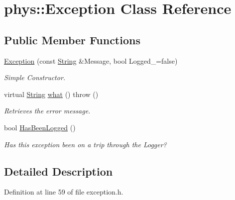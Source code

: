 \hypertarget{classphys_1_1Exception}{
\section{phys::Exception Class Reference}
\label{dc/d47/classphys_1_1Exception}
}
\subsection*{Public Member Functions}
\begin{DoxyCompactItemize}
\item 
\hyperlink{classphys_1_1Exception_a73fd1d2603e30f5663fef2d64df5179f}{Exception} (const \hyperlink{namespacephys_aa03900411993de7fbfec4789bc1d392e}{String} \&Message, bool Logged\_\-=false)
\begin{DoxyCompactList}\small\item\em Simple Constructor. \item\end{DoxyCompactList}\item 
virtual \hyperlink{namespacephys_aa03900411993de7fbfec4789bc1d392e}{String} \hyperlink{classphys_1_1Exception_ac929f9b3929526eec6e6b581c9a9dd73}{what} ()  throw ()
\begin{DoxyCompactList}\small\item\em Retrieves the error message. \item\end{DoxyCompactList}\item 
bool \hyperlink{classphys_1_1Exception_ab1399e25435c390db551855fda338951}{HasBeenLogged} ()
\begin{DoxyCompactList}\small\item\em Has this exception been on a trip through the Logger? \item\end{DoxyCompactList}\end{DoxyCompactItemize}


\subsection{Detailed Description}


Definition at line 59 of file exception.h.



